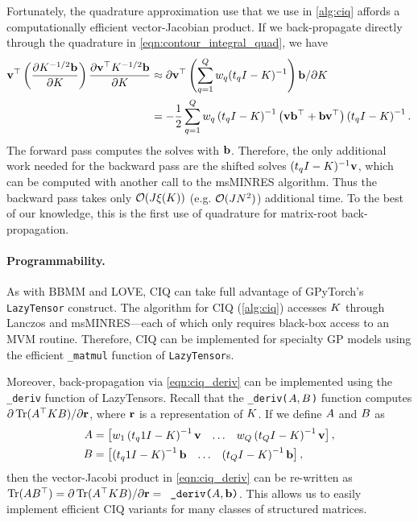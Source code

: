 Fortunately, the quadrature approximation use that we use in \cref{alg:ciq} affords a computationally efficient vector-Jacobian product.
If we back-propagate directly through the quadrature in \cref{eqn:contour_integral_quad}, we have
%
\begin{align}
  \mathbf{v}^\top \left( \frac{ \partial K^{-1/2} \mathbf{b} }{ \partial K } \right)
   \frac{ \partial \mathbf{v}^\top K^{-1/2} \mathbf{b} }{ \partial K }
  &\approx { \partial \ensuremath{\mathbf{v}}^\top \left( \sum_{q=1}^{Q} w_q (t_q \ensuremath{I}- \ensuremath{K})^{-1} \right) \ensuremath{\mathbf{b}}}/{ \partial K }
  \nonumber
  \\
  &= - \frac{1}{2} \sum_{q=1}^{Q} w_q
  \left( t_q I - K \right)^{-1}
  \left( \mathbf{v} \mathbf{b}^\top + \mathbf{b} \mathbf{v}^\top \right)
  \left( t_q I - K \right)^{-1}.
  \label{eqn:ciq_deriv}
\end{align}
%
The forward pass computes the solves with $\mathbf{b}$.
Therefore, the only additional work needed for the backward pass are the shifted solves $(t_q I - K)^{-1} \mathbf{v}$, which can be computed with another call to the msMINRES algorithm.
Thus the backward pass takes only $\bigo{J \mvm{\bK}}$ (e.g. $\bigo{J N^2}$) additional time.
To the best of our knowledge, this is the first use of quadrature for matrix-root back-propagation.

\paragraph{Programmability.}
As with BBMM and LOVE, CIQ can take full advantage of GPyTorch's {\tt LazyTensor} construct.
The algorithm for CIQ (\cref{alg:ciq}) accesses $K$ through Lanczos and msMINRES---each of which only requires black-box access to an MVM routine.
Therefore, CIQ can be implemented for specialty GP models using the efficient {\tt \_matmul} function of {\tt LazyTensor}s.

Moreover, back-propagation via \cref{eqn:ciq_deriv} can be implemented using the {\tt \_deriv} function of LazyTensors.
Recall that the {\tt \_deriv($ A, B $)} function computes $\partial \tr{ \bA^\top \bK \bB }/{\partial \br}$, where $\mathbf{r}$ is a representation of $K$.
If we define $A$ and $B$ as
%
\begin{align*}
  A &= \begin{bmatrix}
    w_1 \left( t_q1I - K \right)^{-1} \mathbf{v}
    & \ldots &
    w_Q \left( t_Q I - K \right)^{-1} \mathbf{v}
  \end{bmatrix},
  \\
  B &= \begin{bmatrix}
    \left( t_q1I - K \right)^{-1} \mathbf{b}
    & \ldots &
    \left( t_Q I - K \right)^{-1} \mathbf{b}
  \end{bmatrix},
\end{align*}
%
then the vector-Jacobi product in \cref{eqn:ciq_deriv} can be re-written as $\tr{ \bA \bB^\top } = \partial \tr{ \bA^\top \bK \bB}/\partial \br = \texttt{ \_deriv($\bA, \bb$)}$.
This allows us to easily implement efficient CIQ variants for many classes of structured matrices.


